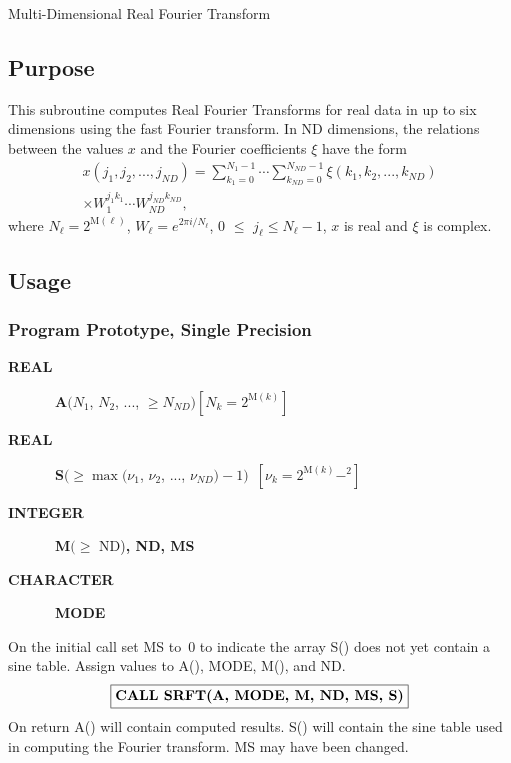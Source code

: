 \documentclass[twoside]{MATH77}
\begin{document}
 Multi-Dimensional Real Fourier Transform


\subsection{Purpose}

This subroutine computes Real Fourier Transforms for real data in up to six
dimensions using the fast Fourier transform. In ND dimensions, the relations
between the values $x$ and the Fourier coefficients $\xi $ have the form%
\begin{multline*}
x(j_1,j_2,...,j_{ND})=\sum_{k_1=0}^{N_1-1}\cdots\sum_{k_{ND}=0}^{N_{ND}-1}%
\xi (k_1,k_2,...,k_{ND})\\
\times W_1^{j_1k_1}\cdots W_{ND}^{j_{ND}k_{ND}},
\end{multline*}
where $N_\ell=2^{\text{M}(\ell)}$, $W_\ell=e^{2\pi i/N_\ell}$, 0 $\leq $ $j_\ell
\leq N_\ell-1$, $x$ is real and $\xi $ is complex.

\subsection{Usage}

\subsubsection{Program Prototype, Single Precision}

\begin{description}
\item[\bf REAL]  \ {\bf A}$(N_1$, $N_2$, ..., $\geq N_{ND})$\quad $%
[N_k=2^{\text{M}(k)}]$

\item[\bf REAL]  \ {\bf S}$(\geq \max (\nu _1$, $\nu _2$, ..., $\nu
_{ND})-1)$\  $[\nu _k=2^{\text{M}(k)}-^2]$

\item[\bf INTEGER]  \ {\bf M}$(\geq $ ND){\bf , ND, MS}

\item[\bf CHARACTER]  \ {\bf MODE}
\end{description}
On the initial call set MS to~0 to indicate the array S() does not yet
contain a sine table. Assign values to A(), MODE, M(), and ND.
$$
\fbox{{\bf CALL SRFT(A, MODE, M, ND, MS, S)}}
$$
On return A() will contain computed results. S() will contain the sine table
used in computing the Fourier transform. MS may have been changed.
\end{document}
